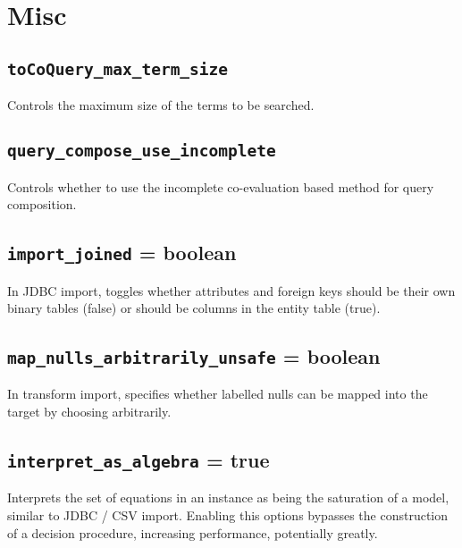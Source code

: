 \documentclass[10pt]{book}
\begin{document}
\section{Misc}

\subsection{{\tt toCoQuery\_max\_term\_size}}

Controls the maximum size of the terms to be searched. 

\subsection{{\tt query\_compose\_use\_incomplete}}

Controls whether to use the incomplete co-evaluation based method for query composition.

\subsection{{\tt import\_joined} = boolean} 

In JDBC import, toggles whether attributes and foreign keys should be their own binary tables (false) or should be columns in the entity table (true).

\subsection{{\tt map\_nulls\_arbitrarily\_unsafe} = boolean}

In transform import, specifies whether labelled nulls can be mapped into the target by choosing arbitrarily.

\subsection{{\tt interpret\_as\_algebra} = true}

Interprets the set of equations in an instance as being the saturation of a model, similar to JDBC / CSV import.  Enabling this options bypasses the construction of a decision procedure, increasing performance, potentially greatly.
\end{document}
